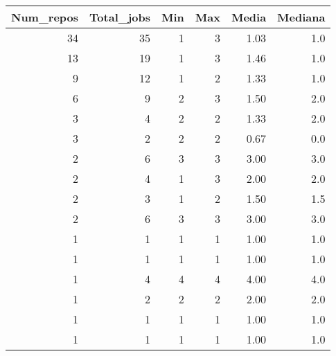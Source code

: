 \begin{tabular}{rrrrrr}
\toprule
 Num\_repos &  Total\_jobs &  Min &  Max &  Media &  Mediana \\
\midrule
        34 &          35 &    1 &    3 &   1.03 &      1.0 \\
        13 &          19 &    1 &    3 &   1.46 &      1.0 \\
         9 &          12 &    1 &    2 &   1.33 &      1.0 \\
         6 &           9 &    2 &    3 &   1.50 &      2.0 \\
         3 &           4 &    2 &    2 &   1.33 &      2.0 \\
         3 &           2 &    2 &    2 &   0.67 &      0.0 \\
         2 &           6 &    3 &    3 &   3.00 &      3.0 \\
         2 &           4 &    1 &    3 &   2.00 &      2.0 \\
         2 &           3 &    1 &    2 &   1.50 &      1.5 \\
         2 &           6 &    3 &    3 &   3.00 &      3.0 \\
         1 &           1 &    1 &    1 &   1.00 &      1.0 \\
         1 &           1 &    1 &    1 &   1.00 &      1.0 \\
         1 &           4 &    4 &    4 &   4.00 &      4.0 \\
         1 &           2 &    2 &    2 &   2.00 &      2.0 \\
         1 &           1 &    1 &    1 &   1.00 &      1.0 \\
         1 &           1 &    1 &    1 &   1.00 &      1.0 \\
\bottomrule
\end{tabular}
